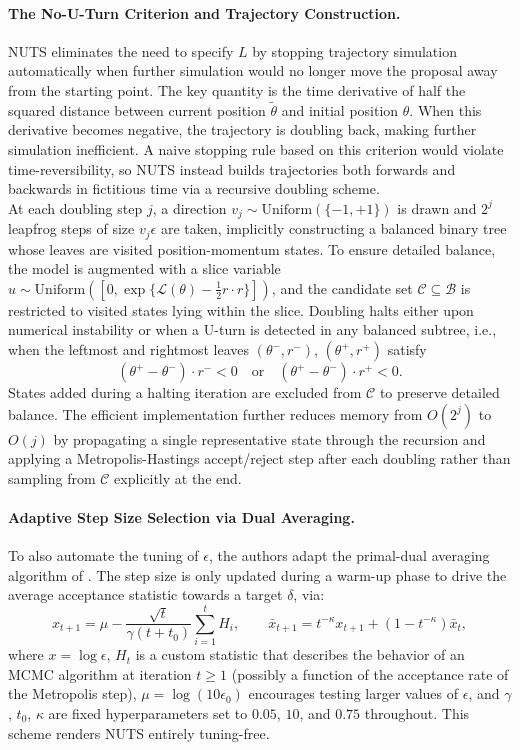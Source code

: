 \documentclass{article}
\begin{document}
\paragraph{The No-U-Turn Criterion and Trajectory Construction.} NUTS eliminates the need to specify $L$ by stopping trajectory simulation automatically when further simulation would no longer move the proposal away from the starting point. The key quantity is the time derivative of half the squared distance between current position $\tilde{\theta}$ and initial position $\theta$. When this derivative becomes negative, the trajectory is doubling back, making further simulation inefficient. A naive stopping rule based on this criterion would violate time-reversibility, so NUTS instead builds trajectories both forwards and backwards in fictitious time via a recursive doubling scheme. \\
At each doubling step $j$, a direction $v_j \sim \mathrm{Uniform}(\{-1,+1\})$ is drawn and $2^j$ leapfrog steps of size $v_j\epsilon$ are taken, implicitly constructing a balanced binary tree whose leaves are visited position-momentum states. To ensure detailed balance, the model is augmented with a slice variable $u \sim \mathrm{Uniform}([0,\exp\{\mathcal{L}(\theta)-\frac{1}{2}r\cdot r\}])$, and the candidate set $\mathcal{C}\subseteq\mathcal{B}$ is restricted to visited states lying within the slice. Doubling halts either upon numerical instability or when a U-turn is detected in any balanced subtree, i.e., when the leftmost and rightmost leaves $(\theta^-, r^-)$, $(\theta^+, r^+)$ satisfy
\[
(\theta^+ - \theta^-) \cdot r^- < 0 \quad \text{or} \quad (\theta^+ - \theta^-) \cdot r^+ < 0.
\]
States added during a halting iteration are excluded from $\mathcal{C}$ to preserve detailed balance. The efficient implementation further reduces memory from $O(2^j)$ to $O(j)$ by propagating a single representative state through the recursion and applying a Metropolis-Hastings accept/reject step after each doubling rather than sampling from $\mathcal{C}$ explicitly at the end.


\paragraph{Adaptive Step Size Selection via Dual Averaging.} To also automate the tuning of $\epsilon$, the authors adapt the primal-dual averaging algorithm of \citet{nesterov2009primal}. The step size is only updated during a warm-up phase to drive the average acceptance statistic towards a target $\delta$, via:
\[
x_{t+1} = \mu - \frac{\sqrt{t}}{\gamma(t + t_0)} \sum_{i=1}^{t} H_i, \qquad \bar{x}_{t+1} = t^{-\kappa} x_{t+1} + (1 - t^{-\kappa}) \bar{x}_t,
\]
where $x = \log\epsilon$, $H_t$ is a custom statistic that describes the behavior of an MCMC algorithm at iteration $t \geq 1$ (possibly a function of the acceptance rate of the Metropolis step), $\mu = \log(10\epsilon_0)$ encourages testing larger values of $\epsilon$, and $\gamma$, $t_0$, $\kappa$ are fixed hyperparameters set to $0.05$, $10$, and $0.75$ throughout. This scheme renders NUTS entirely tuning-free. 
\end{document}
